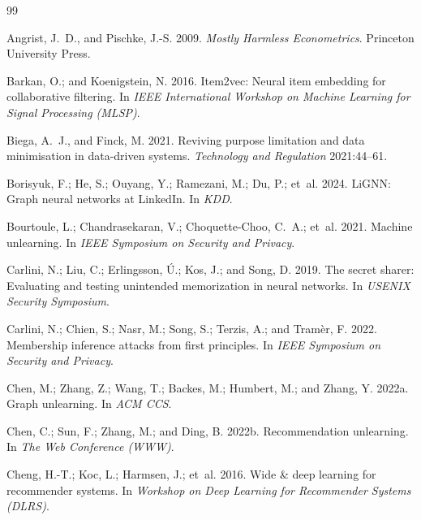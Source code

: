 \documentclass[10pt,twocolumn,letterpaper]{article}
\theoremstyle{definition}
\begin{document}
\footnotesize
\begin{thebibliography}{99}
\setlength{\itemsep}{1pt}

Angrist, J.~D., and Pischke, J.-S. 2009.
\newblock \emph{Mostly Harmless Econometrics}. Princeton University Press.

Barkan, O.; and Koenigstein, N. 2016.
\newblock Item2vec: Neural item embedding for collaborative filtering.
\newblock In \emph{IEEE International Workshop on Machine Learning for Signal Processing (MLSP)}.

Biega, A.~J., and Finck, M. 2021.
\newblock Reviving purpose limitation and data minimisation in data-driven systems.
\newblock \emph{Technology and Regulation} 2021:44--61.

Borisyuk, F.; He, S.; Ouyang, Y.; Ramezani, M.; Du, P.; et~al. 2024.
\newblock LiGNN: Graph neural networks at LinkedIn.
\newblock In \emph{KDD}.

Bourtoule, L.; Chandrasekaran, V.; Choquette-Choo, C.~A.; et~al. 2021.
\newblock Machine unlearning.
\newblock In \emph{IEEE Symposium on Security and Privacy}.

Carlini, N.; Liu, C.; Erlingsson, {\'U}.; Kos, J.; and Song, D. 2019.
\newblock The secret sharer: Evaluating and testing unintended memorization in neural networks.
\newblock In \emph{USENIX Security Symposium}.

Carlini, N.; Chien, S.; Nasr, M.; Song, S.; Terzis, A.; and Tram{\`e}r, F. 2022.
\newblock Membership inference attacks from first principles.
\newblock In \emph{IEEE Symposium on Security and Privacy}.

Chen, M.; Zhang, Z.; Wang, T.; Backes, M.; Humbert, M.; and Zhang, Y. 2022a.
\newblock Graph unlearning.
\newblock In \emph{ACM CCS}.

Chen, C.; Sun, F.; Zhang, M.; and Ding, B. 2022b.
\newblock Recommendation unlearning.
\newblock In \emph{The Web Conference (WWW)}.

Cheng, H.-T.; Koc, L.; Harmsen, J.; et~al. 2016.
\newblock Wide \& deep learning for recommender systems.
\newblock In \emph{Workshop on Deep Learning for Recommender Systems (DLRS)}.


\end{thebibliography}
\end{document}
